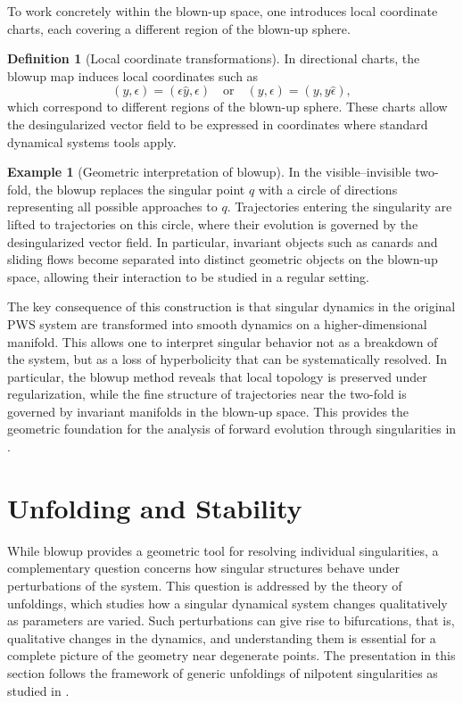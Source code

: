\documentclass[12pt, a4paper, oneside]{book}
\theoremstyle{plain}
\theoremstyle{definition}
\newtheorem{definition}[theorem]{Definition}
\newtheorem{example}[theorem]{Example}
\theoremstyle{remark}
\theoremstyle{definition}
\begin{document}
To work concretely within the blown-up space, one introduces local coordinate charts,
each covering a different region of the blown-up sphere.

\begin{definition}[Local coordinate transformations]
In directional charts, the blowup map induces local coordinates such as
\[
(y,\epsilon) = (\epsilon \hat{y}, \epsilon) \quad \text{or} \quad (y,\epsilon) =
(y, y \hat{\epsilon}),
\]
which correspond to different regions of the blown-up sphere. These charts allow the
desingularized vector field to be expressed in coordinates where standard dynamical
systems tools apply.
\end{definition}

\begin{example}[Geometric interpretation of blowup]
In the visible--invisible two-fold, the blowup replaces the singular point $q$ with a
circle of directions representing all possible approaches to $q$. Trajectories entering
the singularity are lifted to trajectories on this circle, where their evolution is
governed by the desingularized vector field. In particular, invariant objects such as
canards and sliding flows become separated into distinct geometric objects on the blown-up
space, allowing their interaction to be studied in a regular setting.
\end{example}

The key consequence of this construction is that singular dynamics in the original PWS
system are transformed into smooth dynamics on a higher-dimensional manifold. This allows
one to interpret singular behavior not as a breakdown of the system, but as a loss of
hyperbolicity that can be systematically resolved. In particular, the blowup method
reveals that local topology is preserved under regularization, while the fine structure
of trajectories near the two-fold is governed by invariant manifolds in the blown-up
space. This provides the geometric foundation for the analysis of forward evolution
through singularities in \cite{kristiansen2019resolution}.

\section{Unfolding and Stability}

While blowup provides a geometric tool for resolving individual singularities, a
complementary question concerns how singular structures behave under perturbations of the
system. This question is addressed by the theory of unfoldings, which studies how a
singular dynamical system changes qualitatively as parameters are varied. Such
perturbations can give rise to bifurcations, that is, qualitative changes in the dynamics,
and understanding them is essential for a complete picture of the geometry near degenerate
points. The presentation in this section follows the framework of generic unfoldings of
nilpotent singularities as studied in \cite{ibanez2005shil}.
\end{document}
